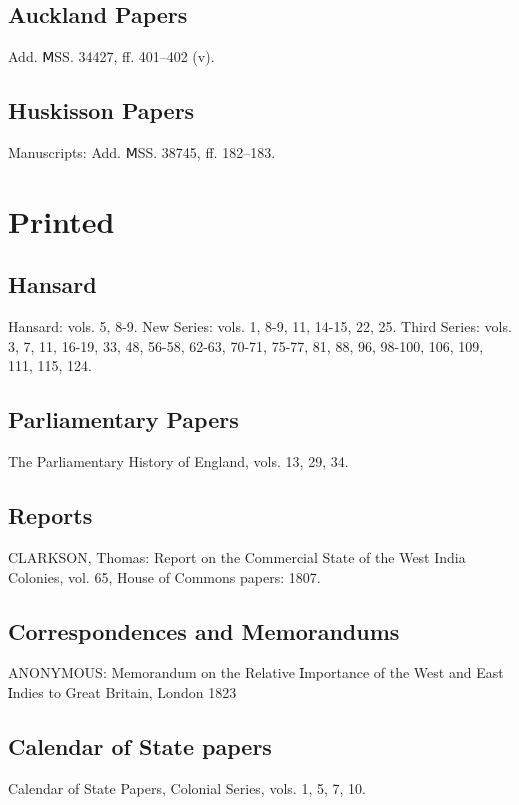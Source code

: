 \subsection{Auckland Papers}
Add. ⅯSS. 34427, ff. 401–402 (v).
\subsection{Huskisson Papers}
Manuscripts: Add. ⅯSS. 38745, ff. 182–183.
\section{Printed}
\subsection{Hansard}
Hansard: vols. 5, 8-9.
New Series: vols. 1, 8-9, 11, 14-15, 22, 25.
Third Series: vols. 3, 7, 11, 16-19, 33, 48, 56-58, 62-63, 70-71, 75-77, 81, 88, 96, 98-100, 106, 109, 111, 115, 124.
\subsection{Parliamentary Papers}
The Parliamentary History of England, vols. 13, 29, 34.
\subsection{Reports}
CLARKSON, Thomas: Report on the Commercial State of the West India Colonies, vol. 65, House of Commons papers: 1807.
\subsection{Correspondences and Memorandums}
ANONYMOUS: Memorandum on the Relative Ɪmportance of the West and East Ɪndies to Great Britain, London 1823
\subsection{Calendar of State papers}
Calendar of State Papers, Colonial Series, vols. 1, 5, 7, 10.